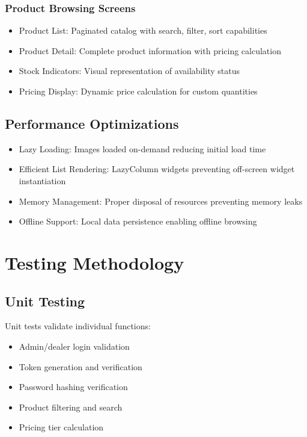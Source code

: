 \documentclass[conference]{IEEEtran}
\begin{document}
\subsubsection{Product Browsing Screens}
\begin{itemize}
\item Product List: Paginated catalog with search, filter, sort capabilities
\item Product Detail: Complete product information with pricing calculation
\item Stock Indicators: Visual representation of availability status
\item Pricing Display: Dynamic price calculation for custom quantities
\end{itemize}

\subsection{Performance Optimizations}

\begin{itemize}
\item Lazy Loading: Images loaded on-demand reducing initial load time
\item Efficient List Rendering: LazyColumn widgets preventing off-screen widget instantiation
\item Memory Management: Proper disposal of resources preventing memory leaks
\item Offline Support: Local data persistence enabling offline browsing
\end{itemize}

\section{Testing Methodology}

\subsection{Unit Testing}

Unit tests validate individual functions:

\begin{itemize}
\item Admin/dealer login validation
\item Token generation and verification
\item Password hashing verification
\item Product filtering and search
\item Pricing tier calculation
\end{itemize}
\end{document}

